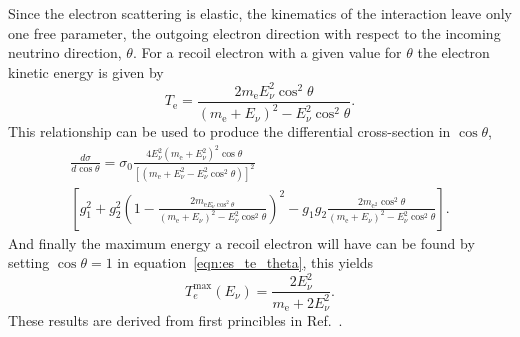 Since the electron scattering is elastic, the kinematics of the interaction
leave only one free parameter, the outgoing electron direction with respect
to the incoming neutrino direction, $\theta$.
For a recoil electron with a given value for $\theta$ the electron kinetic energy is
given by
\begin{equation}
    T_{\mathrm{e}}=\frac{2m_{\mathrm{e}}E_{\nu}^{2}\cos^{2}\theta}{(m_{\mathrm{e}}+E_{\nu})^2 - E_{\nu}^{2}\cos^2\theta}\text{.}
    \label{eqn:es_te_theta}
\end{equation}
This relationship can be used to produce the differential cross-section in $\cos\theta$,
\begin{multline}
\frac{d\sigma}{d\cos\theta}=\sigma_{0}\frac{4E_{\nu}^{2}(m_{\mathrm{e}}+E_{\nu}^{2})^2\cos\theta}{\left[(m_{\mathrm{e}}+E_{\nu}^{2} -E_{\nu}^{2}\cos^2\theta)\right]^2}\\
    \left[g_{1}^{2} + g_{2}^{2}\left(1 - \frac{2m_{\mathrm{e}E_{\nu}\cos^{2}\theta}}{(m_{\mathrm{e}}+E_{\nu})^2 -E_{\nu}^{2}\cos^2\theta} \right)^{2} - g_{1}g_{2}\frac{2m_{\mathrm{e}^{2}}\cos^{2}\theta}{(m_{\mathrm{e}}+E_{\nu})^{2}-E_{\nu}^{2}\cos^{2}\theta}\right]
    \text{.}
\end{multline}
And finally the maximum energy a recoil electron will have can be found by
setting $\cos\theta=1$ in equation~\eqref{eqn:es_te_theta}, this yields
\begin{equation}
    T_{e}^{\max}(E_\nu) = \frac{2E_{\nu}^{2}}{m_{\mathrm{e}}+ 2E_{\nu}^{2} }\text{.}
\end{equation}
These results are derived from first princibles in Ref.~\citep{giuntikim}.

